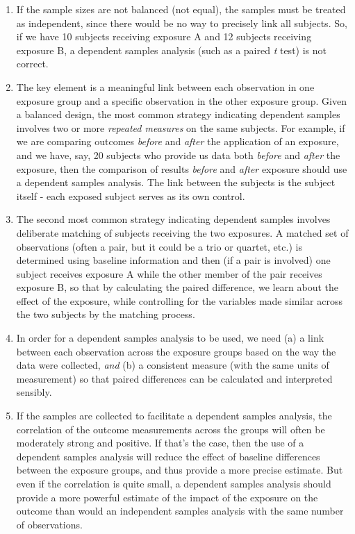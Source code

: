 \documentclass[
]{book}
\begin{document}
\begin{enumerate}
\def\labelenumi{\arabic{enumi}.}
\item
  If the sample sizes are not balanced (not equal), the samples must be treated as independent, since there would be no way to precisely link all subjects. So, if we have 10 subjects receiving exposure A and 12 subjects receiving exposure B, a dependent samples analysis (such as a paired \emph{t} test) is not correct.
\item
  The key element is a meaningful link between each observation in one exposure group and a specific observation in the other exposure group. Given a balanced design, the most common strategy indicating dependent samples involves two or more \emph{repeated measures} on the same subjects. For example, if we are comparing outcomes \emph{before} and \emph{after} the application of an exposure, and we have, say, 20 subjects who provide us data both \emph{before} and \emph{after} the exposure, then the comparison of results \emph{before} and \emph{after} exposure should use a dependent samples analysis. The link between the subjects is the subject itself - each exposed subject serves as its own control.
\item
  The second most common strategy indicating dependent samples involves deliberate matching of subjects receiving the two exposures. A matched set of observations (often a pair, but it could be a trio or quartet, etc.) is determined using baseline information and then (if a pair is involved) one subject receives exposure A while the other member of the pair receives exposure B, so that by calculating the paired difference, we learn about the effect of the exposure, while controlling for the variables made similar across the two subjects by the matching process.
\item
  In order for a dependent samples analysis to be used, we need (a) a link between each observation across the exposure groups based on the way the data were collected, \emph{and} (b) a consistent measure (with the same units of measurement) so that paired differences can be calculated and interpreted sensibly.
\item
  If the samples are collected to facilitate a dependent samples analysis, the correlation of the outcome measurements across the groups will often be moderately strong and positive. If that's the case, then the use of a dependent samples analysis will reduce the effect of baseline differences between the exposure groups, and thus provide a more precise estimate. But even if the correlation is quite small, a dependent samples analysis should provide a more powerful estimate of the impact of the exposure on the outcome than would an independent samples analysis with the same number of observations.
\end{enumerate}
\end{document}
